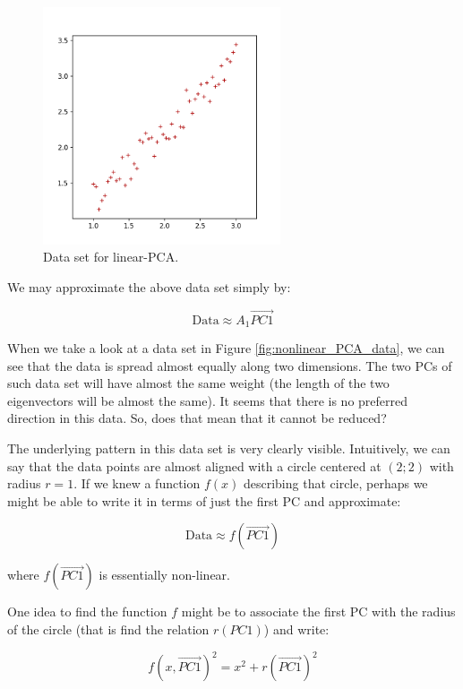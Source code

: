 \documentclass[20pt,twocolumn]{article}
\begin{document}
\begin{figure}[H]
\centering\includegraphics[width=7cm]{../python/PCA-fake-datasets/PCA_linear_scatter_1.png}
\caption{Data set for linear-PCA.}			
\label{fig:linear_PCA_data}
\end{figure}

We may approximate the above data set simply by:

\begin{equation}
\text{Data} \approx A_1 \vec{PC1}
\end{equation}

When we take a look at a data set in Figure \ref{fig:nonlinear_PCA_data}, we can see that the data is spread almost equally along two dimensions. The two PCs of such data set will have almost the same weight (the length of the two eigenvectors will be almost the same). It seems that there is no preferred direction in this data. So, does that mean that it cannot be reduced?

The underlying pattern in this data set is very clearly visible. Intuitively, we can say that the data points are almost aligned with a circle centered at $(2;2)$ with radius $r=1$. If we knew a function $f(x)$ describing that circle, perhaps we might be able to write it in terms of just the first PC and approximate:

\begin{equation}
\text{Data} \approx f(\vec{PC1})
\end{equation}

where $f(\vec{PC1})$ is essentially non-linear.

One idea to find the function $f$ might be to associate the first PC with the radius of the circle (that is find the relation $r(PC1)$) and write:

\begin{equation}
f(x, \vec{PC1})^2 = x^2 + r(\vec{PC1})^2
\end{equation}
\end{document}
